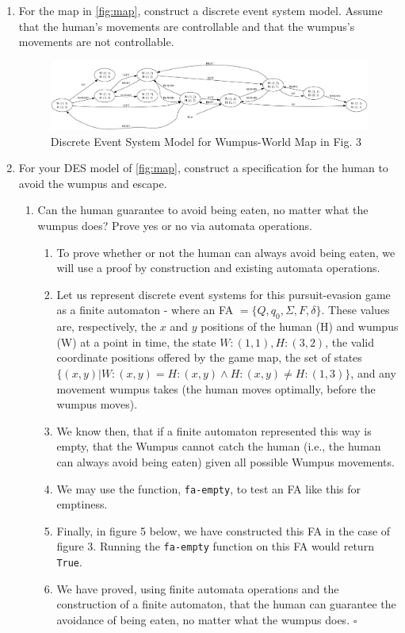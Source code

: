 \documentclass[12pt,letterpaper]{ntdhw}
\begin{document}
\begin{enumerate}

  \item For the map in \ref{fig:map}, construct a discrete event
  system model.  Assume that the human's movements are controllable
  and that the wumpus's movements are not controllable.

  \begin{figure}[ht]
      \centering
      \includegraphics[width=1.0\textwidth]{images/wumpus1.png}
      \caption{Discrete Event System Model for Wumpus-World Map in Fig. 3}
  \end{figure}

\clearpage

  \item For your DES model of \ref{fig:map}, construct a specification
  for the human to avoid the wumpus and escape.
  \begin{enumerate}
    \item Can the human guarantee to avoid being eaten, no matter what
    the wumpus does?  Prove yes or no via automata operations.

    \begin{enumerate}
        \item To prove whether or not the human can always avoid being eaten, we will use a proof by construction and existing automata operations.
        \item Let us represent discrete event systems for this pursuit-evasion game as a finite automaton - 
        where an FA $= \{Q, q_0, \Sigma, F, \delta\}$. These values are, respectively, the $x$ and $y$ positions of the human (H) and wumpus (W) at a point in time, the state $W:(1,1), H:(3,2)$, the valid coordinate positions offered by the game map, the set of states $\{(x,y) | W:(x,y) = H:(x,y) \wedge H:(x,y) \neq H:(1,3)\}$, and any movement wumpus takes (the human moves optimally, before the wumpus moves). 
        \item We know then, that if a finite automaton represented this way is empty, that the Wumpus cannot catch the human (i.e., the human can always avoid being eaten) given all possible Wumpus movements. 
        \item We may use the function, \texttt{fa-empty}, to test an FA like this for emptiness. 
        \item Finally, in figure 5 below, we have constructed this FA in the case of figure 3. Running the \texttt{fa-empty} function on this FA would return \texttt{True}. 
        \item We have proved, using finite automata operations and the construction of a finite automaton, that the human can guarantee the avoidance of being eaten, no matter what the wumpus does. $\square$
    \end{enumerate}


\end{enumerate}
\end{enumerate}
\end{document}
